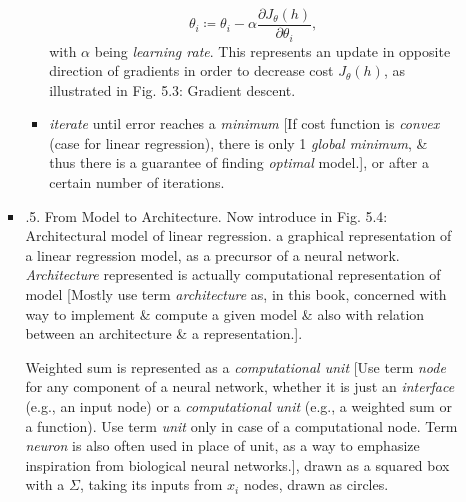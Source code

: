 \documentclass{article}
\begin{document}
\begin{itemize}
\begin{itemize}
\begin{itemize}
\begin{itemize}
				\begin{equation*}
					\theta_i\coloneqq\theta_i - \alpha\frac{\partial J_\theta(h)}{\partial\theta_i},
				\end{equation*}
				with $\alpha$ being {\it learning rate}. This represents an update in opposite direction of gradients in order to decrease cost $J_\theta(h)$, as illustrated in {\sf Fig. 5.3: Gradient descent.}
				\item {\it iterate} until error reaches a {\it minimum} [If cost function is {\it convex} (case for linear regression), there is only 1 {\it global minimum}, \& thus there is a guarantee of finding {\it optimal} model.], or after a certain number of iterations.
			\end{itemize}
			\item {.5. From Model to Architecture.} Now introduce in {\sf Fig. 5.4: Architectural model of linear regression.} a graphical representation of a linear regression model, as a precursor of a neural network. {\it Architecture} represented is actually computational representation of model [Mostly use term {\it architecture} as, in this book, concerned with way to implement \& compute a given model \& also with relation between an architecture \& a representation.].

			Weighted sum is represented as a {\it computational unit} [Use term {\it node} for any component of a neural network, whether it is just an {\it interface} (e.g., an input node) or a {\it computational unit} (e.g., a weighted sum or a function). Use term {\it unit} only in case of a computational node. Term {\it neuron} is also often used in place of unit, as a way to emphasize inspiration from biological neural networks.], drawn as a squared box with a $\Sigma$, taking its inputs from $x_i$ nodes, drawn as circles.


\end{itemize}
\end{itemize}
\end{itemize}
\end{document}
